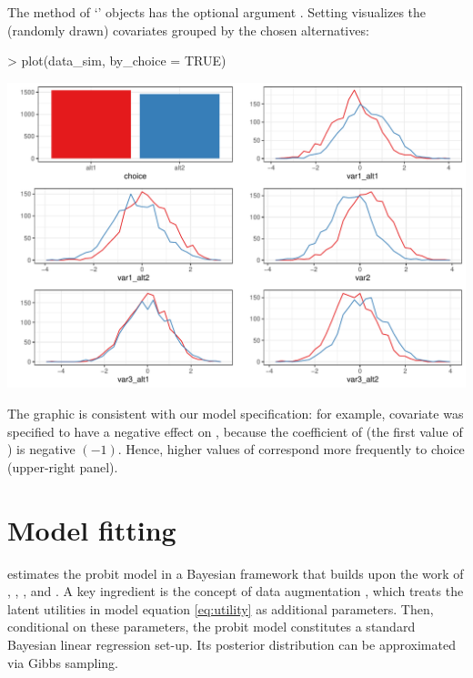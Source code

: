 \documentclass[article,shortnames]{jss}
\newcommand{\class}[1]{`\code{#1}'}
\newcommand{\fct}[1]{\code{#1()}}
\begin{document}
The \fct{plot} method of \class{RprobitB\_data} objects has the optional argument . Setting  visualizes the (randomly drawn) covariates grouped by the chosen alternatives:

\begin{Schunk}
\begin{Sinput}
> plot(data_sim, by_choice = TRUE)
\end{Sinput}
\end{Schunk}
\includegraphics{rprobitb_oelschlaeger_bauer-sim-data}

The graphic is consistent with our model specification: for example, covariate  was specified to have a negative effect on , because the coefficient of  (the first value of ) is negative $(-1)$. Hence, higher values of  correspond more frequently to choice  (upper-right panel).

\section{Model fitting} \label{sec:model_fitting}

 estimates the probit model in a Bayesian framework that builds upon the work of \cite{McCulloch:1994}, \cite{Nobile:1998}, \cite{Allenby:1998}, and \cite{Imai:2005}. A key ingredient is the concept of data augmentation \citep{Albert:1993}, which treats the latent utilities in model equation \eqref{eq:utility} as additional parameters. Then, conditional on these parameters, the probit model constitutes a standard Bayesian linear regression set-up. Its posterior distribution can be approximated via Gibbs sampling.
\end{document}
